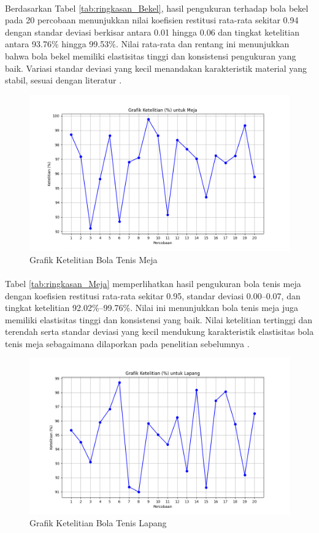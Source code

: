 

\paragraph{}Berdasarkan Tabel \ref{tab:ringkasan_Bekel}, hasil pengukuran terhadap bola bekel pada 20 percobaan menunjukkan nilai koefisien restitusi rata-rata sekitar 0.94 dengan standar deviasi berkisar antara 0.01 hingga 0.06 dan tingkat ketelitian antara 93.76\% hingga 99.53\%. Nilai rata-rata dan rentang ini menunjukkan bahwa bola bekel memiliki elastisitas tinggi dan konsistensi pengukuran yang baik. Variasi standar deviasi yang kecil menandakan karakteristik material yang stabil, sesuai dengan literatur \citep{garcia2021elastic, patel2021coefficient}.

\begin{figure}[!htbp]
    \centering
    \includegraphics[width=0.5\linewidth]{output_tex/Grafik_ketelitian_Meja.png}
    \caption{Grafik Ketelitian Bola Tenis Meja}
    \label{fig:grafik-bola-tenis-meja}
\end{figure}



\paragraph{}Tabel \ref{tab:ringkasan_Meja} memperlihatkan hasil pengukuran bola tenis meja dengan koefisien restitusi rata-rata sekitar 0.95, standar deviasi 0.00--0.07, dan tingkat ketelitian 92.02\%--99.76\%. Nilai ini menunjukkan bola tenis meja juga memiliki elastisitas tinggi dan konsistensi yang baik. Nilai ketelitian tertinggi dan terendah serta standar deviasi yang kecil mendukung karakteristik elastisitas bola tenis meja sebagaimana dilaporkan pada penelitian sebelumnya \citep{izzuddin2015menentukan, stefano2020elastic}.

\begin{figure}[!htbp]
    \centering
    \includegraphics[width=0.5\linewidth]{output_tex/Grafik_ketelitian_Lapang.png}
    \caption{Grafik Ketelitian Bola Tenis Lapang}
    \label{fig:grafik-bola-tenis-lapang}
\end{figure}

